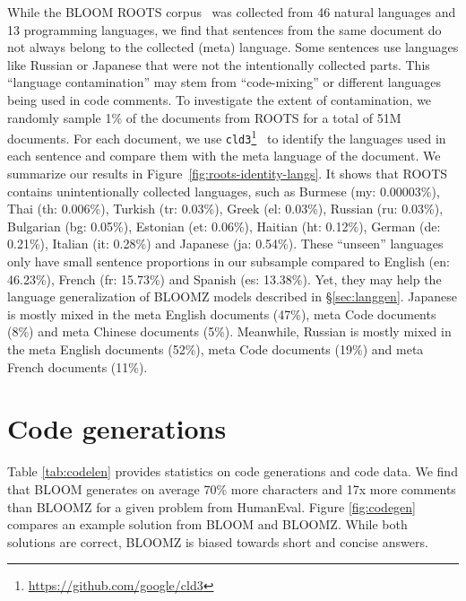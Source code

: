 \documentclass[11pt]{article}
\begin{document}
While the BLOOM ROOTS corpus~\cite{laurencconbigscience} was collected from 46 natural languages and 13 programming languages, we find that sentences from the same document do not always belong to the collected (meta) language. Some sentences use languages like Russian or Japanese that were not the intentionally collected parts. This ``language contamination'' may stem from ``code-mixing'' or different languages being used in code comments. To investigate the extent of contamination, we randomly sample 1\% of the documents from ROOTS for a total of 51M documents. For each document, we use \texttt{cld3}\footnote{\url{https://github.com/google/cld3}}~\cite{xue2020mt5} to identify the languages used in each sentence and compare them with the meta language of the document. We summarize our results in Figure~\ref{fig:roots-identity-langs}. It shows that ROOTS contains unintentionally collected languages, such as Burmese (my: 0.00003\%), Thai (th: 0.006\%), Turkish (tr: 0.03\%), Greek (el: 0.03\%), Russian (ru: 0.03\%), Bulgarian (bg: 0.05\%),  Estonian (et: 0.06\%), Haitian (ht: 0.12\%), German (de: 0.21\%), Italian (it: 0.28\%) and Japanese (ja: 0.54\%). These ``unseen'' languages only have small sentence proportions in our subsample compared to English (en: 46.23\%), French (fr: 15.73\%) and Spanish (es: 13.38\%). Yet, they may help the language generalization of BLOOMZ models described in \S\ref{sec:langgen}. Japanese is mostly mixed in the meta English documents (47\%), meta Code documents (8\%) and meta Chinese documents (5\%). Meanwhile, Russian is mostly mixed in the meta English documents (52\%), meta Code documents (19\%) and meta French documents (11\%).

\FloatBarrier

\section{Code generations}
\label{sec:codegen}

Table \ref{tab:codelen} provides statistics on code generations and code data. We find that BLOOM generates on average 70\% more characters and 17x more comments than BLOOMZ for a given problem from HumanEval. Figure \ref{fig:codegen} compares an example solution from BLOOM and BLOOMZ. While both solutions are correct, BLOOMZ is biased towards short and concise answers.

\begin{figure*}[htbp]
    \centering
    \qquad
    {}
    \caption{Code generations of BLOOM and BLOOMZ on HumanEval. The model is prompted to generate after the final . The generation is stopped after an end-of-sequence token or a return statement followed by a newline.}
    \label{fig:codegen}
\end{figure*}
\end{document}
